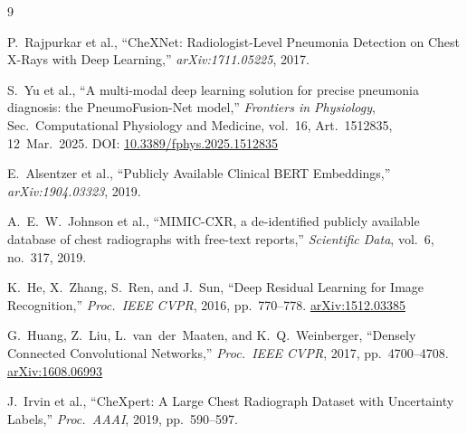 \documentclass{article}
\begin{document}
\clearpage          %
\small              %

\begin{thebibliography}{9}

P.~Rajpurkar et al., ``CheXNet: Radiologist-Level Pneumonia Detection on
Chest X-Rays with Deep Learning,'' \emph{arXiv:1711.05225}, 2017.

S.~Yu et al.,
``A multi-modal deep learning solution for precise pneumonia diagnosis:
the PneumoFusion-Net model,''
\emph{Frontiers in Physiology},
Sec.~Computational Physiology and Medicine,
vol.~16, Art.~1512835, 12~Mar.~2025.
\newblock DOI: \href{https://doi.org/10.3389/fphys.2025.1512835}{10.3389/fphys.2025.1512835}

E.~Alsentzer et al., ``Publicly Available Clinical BERT Embeddings,''
\emph{arXiv:1904.03323}, 2019.

A.~E.~W.~Johnson et al., ``MIMIC-CXR, a de-identified publicly available
database of chest radiographs with free-text reports,''
\emph{Scientific Data}, vol.~6, no.~317, 2019.

K.~He, X.~Zhang, S.~Ren, and J.~Sun,
``Deep Residual Learning for Image Recognition,''
\emph{Proc.\ IEEE CVPR}, 2016, pp.~770--778.
\newblock \href{https://arxiv.org/abs/1512.03385}{arXiv:1512.03385}

G.~Huang, Z.~Liu, L.~van~der~Maaten, and K.~Q.~Weinberger,
``Densely Connected Convolutional Networks,''
\emph{Proc.\ IEEE CVPR}, 2017, pp.~4700--4708.
\newblock \href{https://arxiv.org/abs/1608.06993}{arXiv:1608.06993}

J.~Irvin et al., ``CheXpert: A Large Chest Radiograph Dataset with
Uncertainty Labels,'' \emph{Proc.\ AAAI}, 2019, pp.~590--597.

\end{thebibliography}
\end{document}
